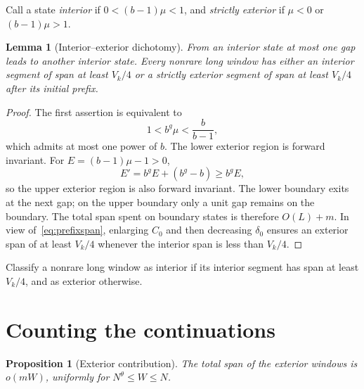 \documentclass[10pt,a4paper]{amsart}
\newtheorem{lemma}[theorem]{Lemma}
\newtheorem{proposition}[theorem]{Proposition}
\begin{document}
Call a state \emph{interior} if $0<(b-1)\mu<1$, and \emph{strictly
exterior} if $\mu<0$ or $(b-1)\mu>1$.

\begin{lemma}[Interior--exterior dichotomy]\label{lem:dichotomy}
From an interior state at most one gap leads to another interior state.
Every nonrare long window has either an interior segment of span at least
$V_k/4$ or a strictly exterior segment of span at least $V_k/4$ after its
initial prefix.
\end{lemma}

\begin{proof}
The first assertion is equivalent to
\[
 1<b^g\mu<\frac b{b-1},
\]
which admits at most one power of $b$. The lower exterior region is forward
invariant. For $E=(b-1)\mu-1>0$,
\[
 E'=b^gE+(b^g-b)\ge b^gE,
\]
so the upper exterior region is also forward invariant. The lower boundary
exits at the next gap; on the upper boundary only a unit gap remains on the
boundary. The total span spent on boundary states is therefore $O(L)+m$.
In view of~\eqref{eq:prefixspan}, enlarging $C_0$ and then decreasing
$\delta_0$ ensures an exterior span of at least $V_k/4$ whenever the interior
span is less than $V_k/4$.
\end{proof}

Classify a nonrare long window as interior if its interior segment has span
at least $V_k/4$, and as exterior otherwise.

\section{Counting the continuations}

\begin{proposition}[Exterior contribution]\label{prop:exterior}
The total span of the exterior windows is $o(mW)$, uniformly for
$N^\theta\le W\le N$.
\end{proposition}
\end{document}
